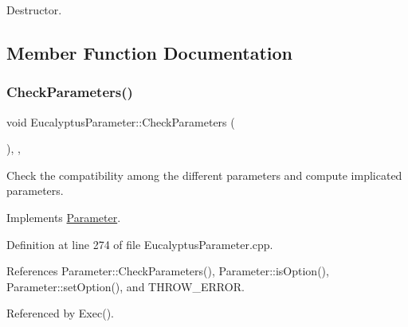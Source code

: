 Destructor. 



\subsection{Member Function Documentation}
\mbox{\label{classEucalyptusParameter_a669c0350f1d4997568f0d9121abe9c3a}} 
\subsubsection{\texorpdfstring{Check\+Parameters()}{CheckParameters()}}
{\footnotesize\ttfamily void Eucalyptus\+Parameter\+::\+Check\+Parameters (\begin{DoxyParamCaption}{ }\end{DoxyParamCaption})\hspace{0.3cm}{\ttfamily [override]}, {\ttfamily [private]}, {\ttfamily [virtual]}}



Check the compatibility among the different parameters and compute implicated parameters. 



Implements \hyperlink{classParameter_a87315799c1a893687f796890f5d4f44d}{Parameter}.



Definition at line 274 of file Eucalyptus\+Parameter.\+cpp.



References Parameter\+::\+Check\+Parameters(), Parameter\+::is\+Option(), Parameter\+::set\+Option(), and T\+H\+R\+O\+W\+\_\+\+E\+R\+R\+OR.



Referenced by Exec().

